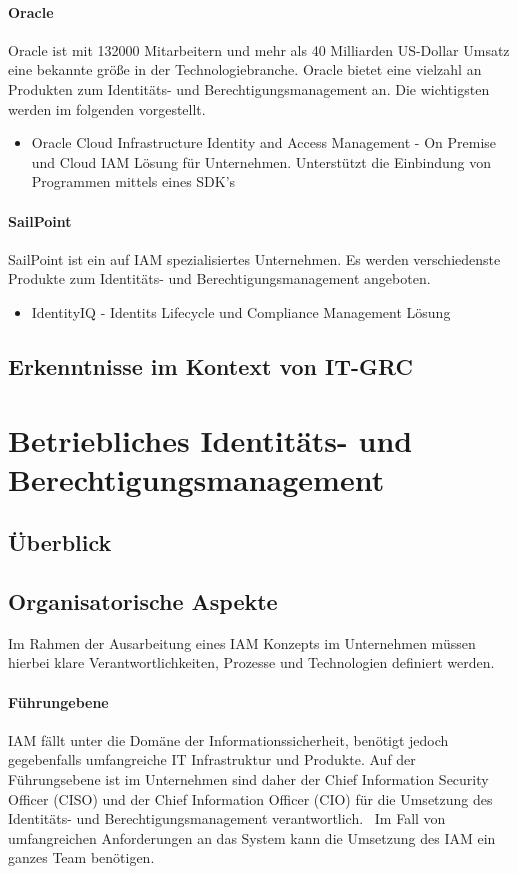 \documentclass[10pt]{article}
\begin{document}
\paragraph{Oracle}
Oracle ist mit 132000 Mitarbeitern und mehr als 40 Milliarden US-Dollar Umsatz eine bekannte größe in der Technologiebranche. Oracle bietet eine vielzahl an Produkten zum Identitäts- und Berechtigungsmanagement an. Die wichtigsten werden im folgenden vorgestellt.
\begin{itemize}
  \item Oracle Cloud Infrastructure Identity and Access Management - On Premise und Cloud IAM Lösung für Unternehmen. Unterstützt die Einbindung von Programmen mittels eines SDK's
\end{itemize}
\paragraph{SailPoint}
SailPoint ist ein auf IAM spezialisiertes Unternehmen. Es werden verschiedenste Produkte zum Identitäts- und Berechtigungsmanagement angeboten.
\begin{itemize}
  \item IdentityIQ - Identits Lifecycle und Compliance Management Lösung
\end{itemize}
\subsection{Erkenntnisse im Kontext von IT-GRC}
\section{Betriebliches Identitäts- und Berechtigungsmanagement}
\label{sec:betrieb}
\subsection{Überblick}
\subsection{Organisatorische Aspekte}
Im Rahmen der Ausarbeitung eines IAM Konzepts im Unternehmen müssen hierbei klare Verantwortlichkeiten, Prozesse und Technologien definiert werden.
\paragraph{Führungebene}
IAM fällt unter die Domäne der Informationssicherheit, benötigt jedoch gegebenfalls umfangreiche IT Infrastruktur und Produkte. Auf der Führungsebene ist im Unternehmen sind daher der Chief Information Security Officer (CISO) und der Chief Information Officer (CIO) für die Umsetzung des Identitäts- und Berechtigungsmanagement verantwortlich.~\cite{azhar2014economics}\cite{baldwin2009using} Im Fall von umfangreichen Anforderungen an das System kann die Umsetzung des IAM ein ganzes Team benötigen.~\cite{mohammed2011identity}
\end{document}
